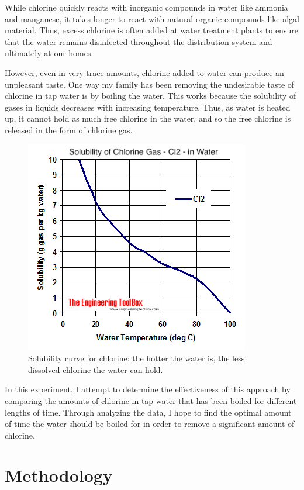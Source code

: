 \documentclass[11pt]{article}
\begin{document}
While chlorine quickly reacts with inorganic compounds in water like ammonia and manganese, it takes longer to react with natural organic compounds like algal material. Thus, excess chlorine is often added at water treatment plants to ensure that the water remains disinfected throughout the distribution system and ultimately at our homes.

However, even in very trace amounts, chlorine added to water can produce an unpleasant taste. One way my family has been removing the undesirable taste of chlorine in tap water is by boiling the water. This works because the solubility of gases in liquids decreases with increasing temperature. Thus, as water is heated up, it cannot hold as much free chlorine in the water, and so the free chlorine is released in the form of chlorine gas.

\begin{figure}[H]
	\centering
	\caption{Solubility curve for chlorine: the hotter the water is, the less dissolved chlorine the water can hold.}
	\includegraphics{assets/cl-solubility.png}
\end{figure}

In this experiment, I attempt to determine the effectiveness of this approach by comparing the amounts of chlorine in tap water that has been boiled for different lengths of time. Through analyzing the data, I hope to find the optimal amount of time the water should be boiled for in order to remove a significant amount of chlorine.

\section{Methodology}
\end{document}
